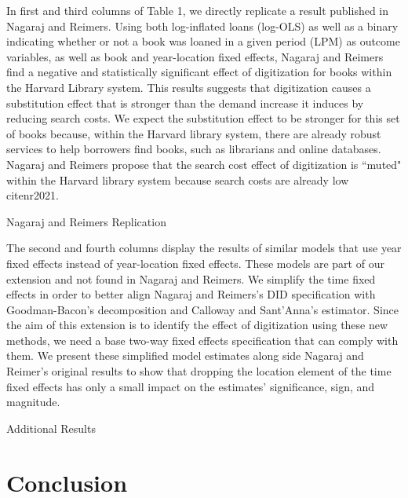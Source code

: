 \documentclass{article}
\begin{document}
In first and third columns of Table 1, we directly replicate a result published in Nagaraj and Reimers. Using both log-inflated loans (log-OLS) as well as a binary indicating whether or not a book was loaned in a given period (LPM) as outcome variables, as well as book and year-location fixed effects, Nagaraj and Reimers find a negative and statistically significant effect of digitization for books within the Harvard Library system. This results suggests that digitization causes a substitution effect that is stronger than the demand increase it induces by reducing search costs. We expect the substitution effect to be stronger for this set of books because, within the Harvard library system, there are already robust services to help borrowers find books, such as librarians and online databases. Nagaraj and Reimers propose that the search cost effect of digitization is ``muted" within the Harvard library system because search costs are already low cite{nr2021}. 

\begin{table}[htbp]
   \centering
   \caption{Nagaraj and Reimers Replication}
  
   \label{tab:booktabs}
\end{table}

The second and fourth columns display the results of similar models that use year fixed effects instead of year-location fixed effects. These models are part of our extension and not found in Nagaraj and Reimers. We simplify the time fixed effects in order to better align Nagaraj and Reimers's DID specification with Goodman-Bacon's decomposition and Calloway and Sant'Anna's estimator. Since the aim of this extension is to identify the effect of digitization using these new methods, we need a base two-way fixed effects specification that can comply with them. We present these simplified model estimates along side Nagaraj and Reimer's original results to show that dropping the location element of the time fixed effects has only a small impact on the estimates' significance, sign, and magnitude.

\begin{table}[htbp]
   \centering
   \caption{Additional Results}
  
   \label{tab:booktabs}
\end{table}





\section{Conclusion}
\end{document}
